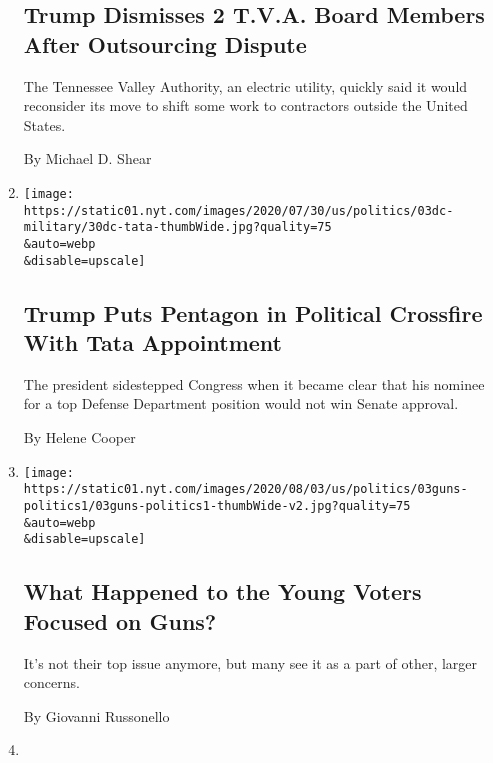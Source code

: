 \begin{enumerate}
  \hypertarget{trump-dismisses-2-tva-board-members-after-outsourcing-dispute}{%
  \subsection{Trump Dismisses 2 T.V.A. Board Members After Outsourcing
  Dispute}\label{trump-dismisses-2-tva-board-members-after-outsourcing-dispute}}

  The Tennessee Valley Authority, an electric utility, quickly said it
  would reconsider its move to shift some work to contractors outside
  the United States.

  By Michael D. Shear
\item
  \href{/2020/08/03/us/politics/tata-pentagon.html}{}

  \texttt{[image: https://static01.nyt.com/images/2020/07/30/us/politics/03dc-military/30dc-tata-thumbWide.jpg?quality=75\\\&auto=webp\\\&disable=upscale]}

  \hypertarget{trump-puts-pentagon-in-political-crossfire-with-tata-appointment}{%
  \subsection{Trump Puts Pentagon in Political Crossfire With Tata
  Appointment}\label{trump-puts-pentagon-in-political-crossfire-with-tata-appointment}}

  The president sidestepped Congress when it became clear that his
  nominee for a top Defense Department position would not win Senate
  approval.

  By Helene Cooper
\item
  \href{/2020/08/03/us/politics/gun-control-voters.html}{}

  \texttt{[image: https://static01.nyt.com/images/2020/08/03/us/politics/03guns-politics1/03guns-politics1-thumbWide-v2.jpg?quality=75\\\&auto=webp\\\&disable=upscale]}

  \hypertarget{what-happened-to-the-young-voters-focused-on-guns}{%
  \subsection{What Happened to the Young Voters Focused on
  Guns?}\label{what-happened-to-the-young-voters-focused-on-guns}}

  It's not their top issue anymore, but many see it as a part of other,
  larger concerns.

  By Giovanni Russonello
\item
  \href{/2020/08/03/us/politics/kris-kobach-kansas-senate-primary.html}{}


\end{enumerate}
